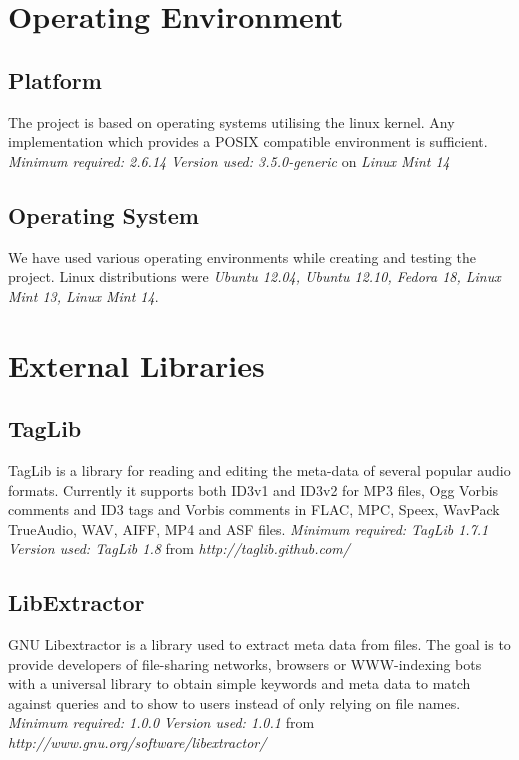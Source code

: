 \section {Operating Environment}
\subsection {Platform}
The project is based on operating systems utilising the linux kernel. Any implementation which provides a POSIX compatible environment is sufficient. \newline
\emph{Minimum required: 2.6.14} \newline
\emph{Version used: 3.5.0-generic} on \emph{Linux Mint 14}

\subsection {Operating System}
We have used various operating environments while creating and testing the project. Linux distributions were \emph{Ubuntu 12.04, Ubuntu 12.10, Fedora 18, Linux Mint 13, Linux Mint 14}.

\section {External Libraries}
\subsection{TagLib}
TagLib is a library for reading and editing the meta-data of several popular audio formats. Currently it supports both ID3v1 and ID3v2 for MP3 files, Ogg Vorbis comments and ID3 tags and Vorbis comments in FLAC, MPC, Speex, WavPack TrueAudio, WAV, AIFF, MP4 and ASF files. \newline
\emph{Minimum required: TagLib 1.7.1} \newline
\emph{Version used: TagLib 1.8} from \emph{http://taglib.github.com/}

\subsection{LibExtractor}
GNU Libextractor is a library used to extract meta data from files. The goal is to provide developers of file-sharing networks, browsers or WWW-indexing bots with a universal library to obtain simple keywords and meta data to match against queries and to show to users instead of only relying on file names.  \newline
\emph{Minimum required: 1.0.0} \newline
\emph{Version used: 1.0.1} from \emph{http://www.gnu.org/software/libextractor/}

